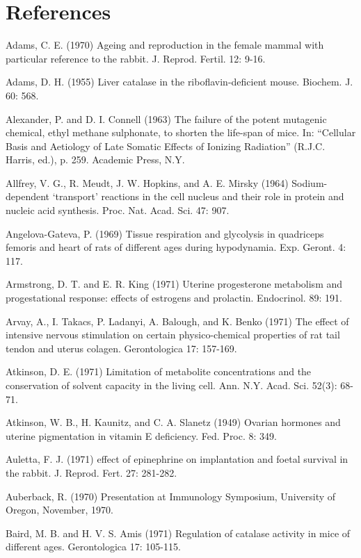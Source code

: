 \chapter{References}

Adams, C. E. (1970) Ageing and reproduction in the female mammal with particular reference to the rabbit. J. Reprod. Fertil. 12: 9-16.

Adams, D. H. (1955) Liver catalase in the riboflavin-deficient mouse. Biochem. J. 60: 568.

Alexander, P. and D. I. Connell (1963) The failure of the potent mutagenic chemical, ethyl methane sulphonate, to shorten the life-span of mice. In: ``Cellular Basis and Aetiology of Late Somatic Effects of Ionizing Radiation'' (R.J.C. Harris, ed.), p. 259. Academic Press, N.Y.

Allfrey, V. G., R. Meudt, J. W. Hopkins, and A. E. Mirsky (1964) Sodium-dependent `transport' reactions in the cell nucleus and their role in protein and nucleic acid synthesis. Proc. Nat. Acad. Sci. 47: 907.

Angelova-Gateva, P. (1969) Tissue respiration and glycolysis in quadriceps femoris and heart of rats of different ages during hypodynamia. Exp. Geront. 4: 117.

Armstrong, D. T. and E. R. King (1971) Uterine progesterone metabolism and progestational response: effects of estrogens and prolactin. Endocrinol. 89: 191.

Arvay, A., I. Takacs, P. Ladanyi, A. Balough, and K. Benko (1971) The effect of intensive nervous stimulation on certain physico-chemical properties of rat tail tendon and uterus colagen. Gerontologica 17: 157-169.

Atkinson, D. E. (1971) Limitation of metabolite concentrations and the conservation of solvent capacity in the living cell. Ann. N.Y. Acad. Sci. 52(3): 68-71.

Atkinson, W. B., H. Kaunitz, and C. A. Slanetz (1949) Ovarian hormones and uterine pigmentation in vitamin E deficiency. Fed. Proc. 8: 349.

Auletta, F. J. (1971) effect of epinephrine on implantation and foetal survival in the rabbit. J. Reprod. Fert. 27: 281-282.

Auberback, R. (1970) Presentation at Immunology Symposium, University of Oregon, November, 1970.

Baird, M. B. and H. V. S. Amis (1971) Regulation of catalase activity in mice of different ages. Gerontologica 17: 105-115.

